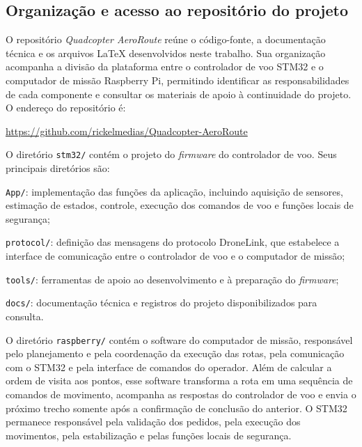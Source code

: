 \begin{apendicesenv}
    \newpage

    \chapter{Organização e acesso ao repositório do projeto}
    \label{ap:repositorio}

    O repositório \textit{Quadcopter AeroRoute} reúne o código-fonte, a documentação técnica e os arquivos LaTeX desenvolvidos neste trabalho. Sua organização acompanha a divisão da plataforma entre o controlador de voo STM32 e o computador de missão Raspberry Pi, permitindo identificar as responsabilidades de cada componente e consultar os materiais de apoio à continuidade do projeto. O endereço do repositório é:

    \begin{center}
        \url{https://github.com/rickelmedias/Quadcopter-AeroRoute}
    \end{center}

    O diretório \texttt{stm32/} contém o projeto do \textit{firmware} do controlador de voo. Seus principais diretórios são:

    \begin{alineastcc}
        \item \texttt{App/}: implementação das funções da aplicação, incluindo aquisição de sensores, estimação de estados, controle, execução dos comandos de voo e funções locais de segurança;
        \item \texttt{protocol/}: definição das mensagens do protocolo DroneLink, que estabelece a interface de comunicação entre o controlador de voo e o computador de missão;
        \item \texttt{tools/}: ferramentas de apoio ao desenvolvimento e à preparação do \textit{firmware};
        \item \texttt{docs/}: documentação técnica e registros do projeto disponibilizados para consulta.
    \end{alineastcc}

    O diretório \texttt{raspberry/} contém o software do computador de missão, responsável pelo planejamento e pela coordenação da execução das rotas, pela comunicação com o STM32 e pela interface de comandos do operador. Além de calcular a ordem de visita aos pontos, esse software transforma a rota em uma sequência de comandos de movimento, acompanha as respostas do controlador de voo e envia o próximo trecho somente após a confirmação de conclusão do anterior. O STM32 permanece responsável pela validação dos pedidos, pela execução dos movimentos, pela estabilização e pelas funções locais de segurança.


\end{apendicesenv}
